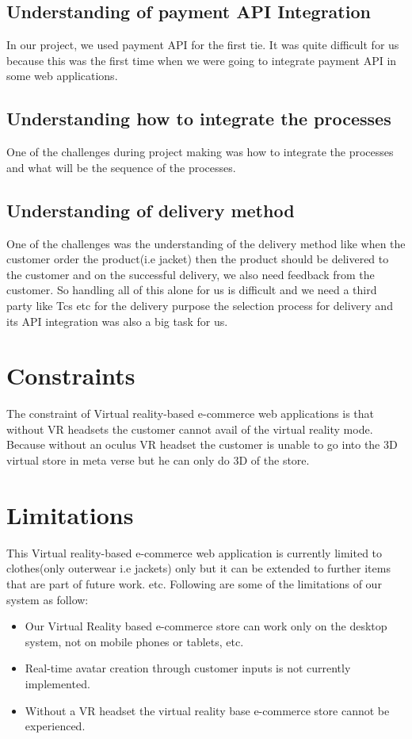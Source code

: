 \subsection{Understanding of payment API Integration}
\justifying
In our project, we used payment API for the first tie. It was quite difficult for us because this was the first time when we were going to integrate payment API in some web applications.
\subsection{Understanding how to integrate the processes}
\justifying
One of the challenges during project making was how to integrate the processes and what will be the sequence of the processes.
\subsection{Understanding of delivery method}
\justifying
One of the challenges was the understanding of the delivery method like when the customer order the product(i.e jacket) then the product should be delivered to the customer and on the successful delivery, we also need feedback from the customer. So handling all of this alone for us is difficult and we need a third party like Tcs etc for the delivery purpose the selection process for delivery and its API integration was also a big task for us.
\section{Constraints}
\justifying
The constraint of Virtual reality-based e-commerce web applications is that without VR headsets the customer cannot avail of the virtual reality mode. Because without an oculus VR headset the customer is unable to go into the 3D virtual store in meta verse but he can only do 3D of the store.
\section{Limitations}
This Virtual reality-based e-commerce web application is currently limited to clothes(only outerwear i.e jackets) only but it can be extended to further items that are part of future work.
etc.
Following are some of the limitations of our system as follow:
\begin{itemize}
    \item Our Virtual Reality based e-commerce store can work only on the desktop system, not on mobile phones or tablets, etc. 
    \item Real-time avatar creation through customer inputs is not currently implemented.
    \item Without a VR headset the virtual reality base e-commerce store cannot be experienced.
\end{itemize}

